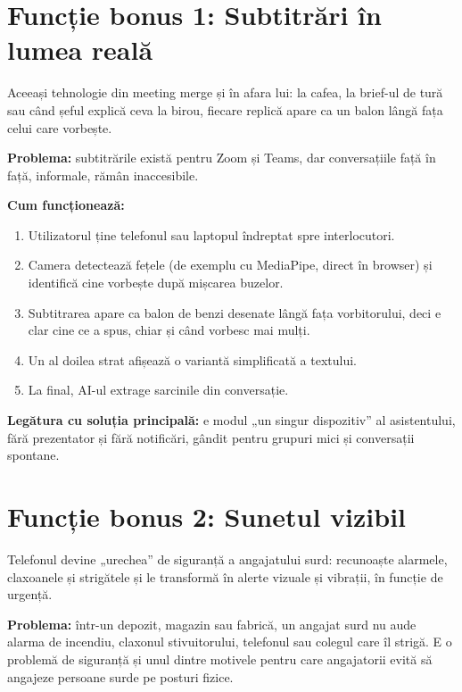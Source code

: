 \documentclass[11pt,a4paper]{article}
\begin{document}
\section*{Funcție bonus 1: Subtitrări în lumea reală}

Aceeași tehnologie din meeting merge și în afara lui: la cafea, la brief-ul de tură sau când șeful explică ceva la birou, fiecare replică apare ca un balon lângă fața celui care vorbește.

\textbf{Problema:} subtitrările există pentru Zoom și Teams, dar conversațiile față în față, informale, rămân inaccesibile.

\textbf{Cum funcționează:}
\begin{enumerate}
  \item Utilizatorul ține telefonul sau laptopul îndreptat spre interlocutori.
  \item Camera detectează fețele (de exemplu cu MediaPipe, direct în browser) și identifică cine vorbește după mișcarea buzelor.
  \item Subtitrarea apare ca balon de benzi desenate lângă fața vorbitorului, deci e clar cine ce a spus, chiar și când vorbesc mai mulți.
  \item Un al doilea strat afișează o variantă simplificată a textului.
  \item La final, AI-ul extrage sarcinile din conversație.
\end{enumerate}

\textbf{Legătura cu soluția principală:} e modul „un singur dispozitiv” al asistentului, fără prezentator și fără notificări, gândit pentru grupuri mici și conversații spontane.

\section*{Funcție bonus 2: Sunetul vizibil}

Telefonul devine „urechea” de siguranță a angajatului surd: recunoaște alarmele, claxoanele și strigătele și le transformă în alerte vizuale și vibrații, în funcție de urgență.

\textbf{Problema:} într-un depozit, magazin sau fabrică, un angajat surd nu aude alarma de incendiu, claxonul stivuitorului, telefonul sau colegul care îl strigă. E o problemă de siguranță și unul dintre motivele pentru care angajatorii evită să angajeze persoane surde pe posturi fizice.
\end{document}
